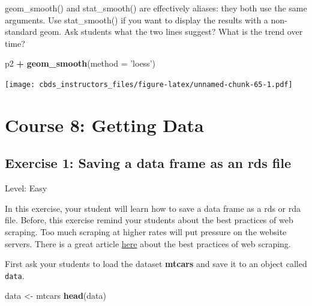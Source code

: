 \documentclass[]{book}
\newenvironment{Shaded}{\begin{snugshade}}{\end{snugshade}}
\newcommand{\DataTypeTok}[1]{\textcolor[rgb]{0.13,0.29,0.53}{#1}}
\newcommand{\KeywordTok}[1]{\textcolor[rgb]{0.13,0.29,0.53}{\textbf{#1}}}
\newcommand{\NormalTok}[1]{#1}
\newcommand{\OperatorTok}[1]{\textcolor[rgb]{0.81,0.36,0.00}{\textbf{#1}}}
\newcommand{\StringTok}[1]{\textcolor[rgb]{0.31,0.60,0.02}{#1}}
\begin{document}
geom\_smooth() and stat\_smooth() are effectively aliases: they both use the same arguments. Use stat\_smooth() if you want to display the results with a non-standard geom. Ask students what the two lines suggest? What is the trend over time?

\begin{Shaded}
\begin{Highlighting}[]
\NormalTok{p2 }\OperatorTok{+}\StringTok{ }\KeywordTok{geom_smooth}\NormalTok{(}\DataTypeTok{method =} \StringTok{'loess'}\NormalTok{)}
\end{Highlighting}
\end{Shaded}

\texttt{[image: cbds\_instructors\_files/figure-latex/unnamed-chunk-65-1.pdf]}

\hypertarget{getting-data}{%
\chapter*{Course 8: Getting Data}\label{getting-data}}

\hypertarget{exercise-1-saving-a-data-frame-as-an-rds-file}{%
\section*{Exercise 1: Saving a data frame as an rds file}\label{exercise-1-saving-a-data-frame-as-an-rds-file}}

Level: Easy

In this exercise, your student will learn how to save a data frame as a rds or rda file. Before, this exercise remind your students about the best practices of web scraping. Too much scraping at higher rates will put pressure on the website servers. There is a great article \href{https://www.scrapehero.com/how-to-prevent-getting-blacklisted-while-scraping/}{here} about the best practices of web scraping.

First ask your students to load the dataset \textbf{mtcars} and save it to an object called \texttt{data}.

\begin{Shaded}
\begin{Highlighting}[]
\NormalTok{data <-}\StringTok{ }\NormalTok{mtcars}
\KeywordTok{head}\NormalTok{(data)}
\end{Highlighting}
\end{Shaded}
\end{document}
